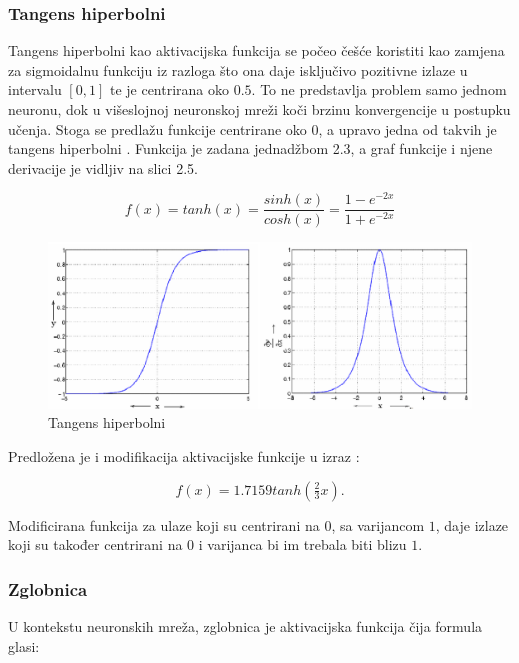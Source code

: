 \documentclass[times, utf8, diplomski]{fer}
\begin{document}
\subsubsection{Tangens hiperbolni}
Tangens hiperbolni kao aktivacijska funkcija se počeo češće koristiti kao zamjena za sigmoidalnu funkciju iz razloga što ona daje isključivo pozitivne izlaze u intervalu $[0, 1]$ te je centrirana oko $0.5$. To ne predstavlja problem samo jednom neuronu, dok u višeslojnoj neuronskoj mreži koči brzinu konvergencije u postupku učenja. Stoga se predlažu funkcije centrirane oko $0$, a upravo jedna od takvih je tangens hiperbolni \cite{efficient}. Funkcija je zadana jednadžbom 2.3, a graf funkcije i njene derivacije je vidljiv na slici 2.5.

\begin{equation}
    f(x)=tanh(x)=\frac{sinh(x)}{cosh(x)}=\frac{1 - e^{-2x}}{1 + e^{-2x}}
\end{equation}

\begin{figure}[htbp]
    \centering
    \includegraphics[scale=0.5]{Slike/tanh}
    \caption{Tangens hiperbolni \cite{tanh}}
\end{figure}

Predložena je i modifikacija aktivacijske funkcije u izraz \cite{efficient}:

\begin{equation}
    f(x)=1.7159 tanh\left( \tfrac{2}{3}x \right).
\end{equation}

Modificirana funkcija za ulaze koji su centrirani na $0$, sa varijancom $1$, daje izlaze koji su također centrirani na $0$ i varijanca bi im trebala biti blizu $1$.

\subsubsection{Zglobnica}

U kontekstu neuronskih mreža, zglobnica je aktivacijska funkcija čija formula glasi:
\end{document}
